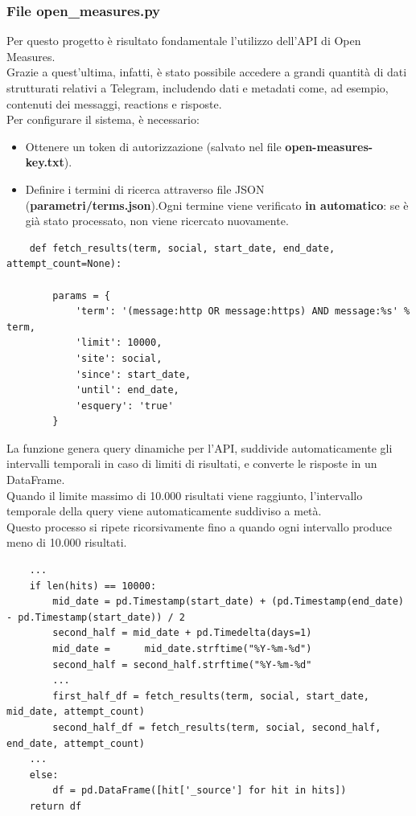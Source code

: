 \documentclass[12pt]{article}
\begin{document}
	\subsubsection{File open\_measures.py}
	Per questo progetto è risultato fondamentale l'utilizzo dell'API di Open Measures.\\
	Grazie a quest'ultima, infatti, è stato possibile accedere a grandi quantità di dati strutturati relativi a Telegram, includendo dati e metadati come, ad esempio, contenuti dei messaggi, reactions e risposte.\\
	Per configurare il sistema, è necessario:
	\begin{itemize}[label=] 
		\item Ottenere un token di autorizzazione (salvato nel file \textbf{open-measures-key.txt}).
		\item Definire i termini di ricerca attraverso file JSON (\textbf{parametri/terms.json}).Ogni termine viene verificato \textbf{in automatico}: se è già stato processato, non viene ricercato nuovamente.
	\end{itemize}
	\begin{lstlisting}
	def fetch_results(term, social, start_date, end_date, attempt_count=None):
		
		params = {
			'term': '(message:http OR message:https) AND message:%s' % term,
			'limit': 10000,
			'site': social,
			'since': start_date,
			'until': end_date,
			'esquery': 'true'
		}
	\end{lstlisting}
	La funzione genera query dinamiche per l’API, suddivide automaticamente gli intervalli temporali in caso di limiti di risultati, e converte le risposte in un DataFrame.\\
	Quando il limite massimo di 10.000 risultati viene raggiunto, l'intervallo temporale della query viene automaticamente suddiviso a metà.\\ Questo processo si ripete ricorsivamente fino a quando ogni intervallo produce meno di 10.000 risultati.
	\begin{lstlisting}
	...
	if len(hits) == 10000:
		mid_date = pd.Timestamp(start_date) + (pd.Timestamp(end_date) - pd.Timestamp(start_date)) / 2
		second_half = mid_date + pd.Timedelta(days=1)
		mid_date = 		mid_date.strftime("%Y-%m-%d")
		second_half = second_half.strftime("%Y-%m-%d"
		...
		first_half_df = fetch_results(term, social, start_date, mid_date, attempt_count)
		second_half_df = fetch_results(term, social, second_half, end_date, attempt_count)
	...
	else:
		df = pd.DataFrame([hit['_source'] for hit in hits])
	return df
	\end{lstlisting}
\end{document}
